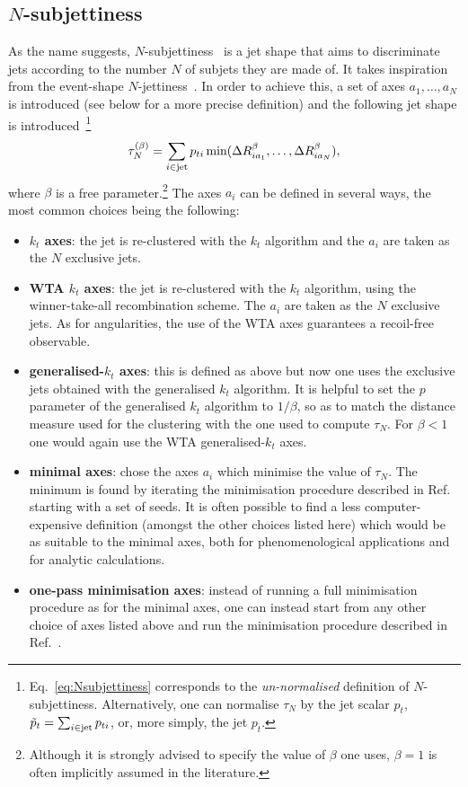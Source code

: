 \subsection{$N$-subjettiness}\label{sec:def-Nsubjettiness}
As the name suggests, $N$-subjettiness~\cite{Thaler:2010tr} is a jet shape that aims to discriminate jets according to the number $N$ of subjets they are made of. 
It takes inspiration from the event-shape $N$-jettiness~\cite{Stewart:2010tn}.
In order to achieve this, a set of axes $a_1,\dots,a_N$ is introduced (see below for a more precise
definition) and the following jet shape is introduced~\footnote{Eq.~\eqref{eq:Nsubjettiness} corresponds to the {\em
    un-normalised} definition of $N$-subjettiness. Alternatively, one
  can normalise $\tau_N$ by the jet scalar $p_t$,
  $\tilde p_t=\sum_{i\in{\text{jet}}}p_{ti}$, or, more simply, the jet $p_t$.}
\begin{equation}\label{eq:Nsubjettiness}
  \tau_N^{(\beta)} = \sum_{i\in{\text{jet}}} p_{ti}\,
  {\text{min}}(\Delta R_{ia_1}^\beta,\dots,\Delta R_{ia_N}^\beta),
\end{equation}
where $\beta$ is a free parameter.\footnote{Although it is strongly
advised to specify the value of $\beta$ one uses, $\beta=1$ is
often implicitly assumed in the literature.}
%
The axes $a_i$  can be defined in several ways, the most common
choices being the following:
\begin{itemize}
\item {\bf $k_t$ axes}: the jet is re-clustered with the $k_t$
  algorithm and the $a_i$ are taken as the  $N$ exclusive jets.
\item {\bf WTA $k_t$ axes}: the jet is re-clustered with the $k_t$
  algorithm, using the winner-take-all recombination scheme. The $a_i$
  are taken as the $N$ exclusive jets. As for angularities, the
  use of the WTA axes guarantees a recoil-free observable.
\item {\bf generalised-$k_t$ axes}: this is defined as above but now
  one uses the exclusive jets obtained with the generalised $k_t$
  algorithm.
  It is helpful to set the $p$ parameter of the generalised $k_t$
  algorithm to $1/\beta$, so as to match the distance measure used for
  the clustering with the one used to compute $\tau_N$.
  For $\beta<1$ one would again use the WTA generalised-$k_t$ axes.
\item {\bf minimal axes}: chose the axes $a_i$ which minimise the
  value of $\tau_N$. The minimum is found by iterating the
  minimisation procedure described in Ref.~\cite{Thaler:2011gf}
  starting with a set of seeds. It is often possible to find a less
  computer-expensive definition (amongst the other choices listed
  here) which would be as suitable to the minimal axes, both for
  phenomenological applications and for analytic calculations.
\item {\bf one-pass minimisation axes}: instead of running a full
  minimisation procedure as for the minimal axes, one can instead
  start from any other choice of axes listed above and run the
  minimisation procedure described in Ref.~\cite{Thaler:2011gf}.
\end{itemize}

